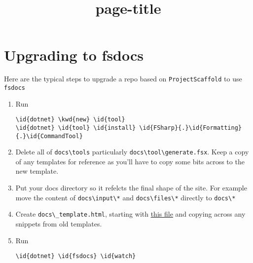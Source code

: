 \documentclass{article}
\title{{page-title}}
\date{}
\newcommand{\id}[1]{\textcolor{black}{#1}}
\newcommand{\kwd}[1]{\textcolor{navy}{#1}}
\begin{document}
\maketitle

\section*{Upgrading to fsdocs}



Here are the typical steps to upgrade a repo based on \texttt{ProjectScaffold} to use \texttt{fsdocs}
\begin{enumerate}
\item 

Run
\begin{Verbatim}[commandchars=\\\{\}]
\id{dotnet} \kwd{new} \id{tool}
\id{dotnet} \id{tool} \id{install} \id{FSharp}{.}\id{Formatting}{.}\id{CommandTool}

\end{Verbatim}


\item 

Delete all of \texttt{docs{\textbackslash}tools} particularly \texttt{docs{\textbackslash}tool{\textbackslash}generate.fsx}.  Keep a copy of any templates for reference as you'll have to copy some bits across to the new template.

\item 

Put your docs directory so it refelcts the final shape of the site. For example move the content of \texttt{docs{\textbackslash}input{\textbackslash}*} and \texttt{docs{\textbackslash}files{\textbackslash}*} directly to \texttt{docs{\textbackslash}*}

\item 

Create \texttt{docs{\textbackslash}\_template.html}, starting with \href{https://github.com/fsprojects/FSharp.Formatting/blob/master/misc/templates/\_template.html}{this file} and
copying across any snippets from old templates.

\item 

Run
\begin{Verbatim}[commandchars=\\\{\}]
\id{dotnet} \id{fsdocs} \id{watch}

\end{Verbatim}




\end{enumerate}
\end{document}
